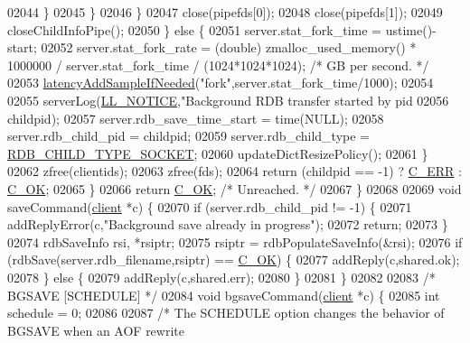 \begin{DoxyCode}
{{{{{{{{{{{{{{{{{{{{{{{{{{{{{{{{{{{{{{{{02044                     \}
02045                 \}
02046             \}
02047             close(pipefds[0]);
02048             close(pipefds[1]);
02049             closeChildInfoPipe();
02050         \} \textcolor{keywordflow}{else} \{
02051             server.stat\_fork\_time = ustime()-start;
02052             server.stat\_fork\_rate = (\textcolor{keywordtype}{double}) zmalloc\_used\_memory() * 1000000 / server.stat\_fork\_time /
       (1024*1024*1024); \textcolor{comment}{/* GB per second. */}
02053             \hyperlink{latency_8h_a77922ab34035890c90f98831a9071359}{latencyAddSampleIfNeeded}(\textcolor{stringliteral}{"fork"},server.stat\_fork\_time/1000);
02054 
02055             serverLog(\hyperlink{server_8h_a8c54c191e436c7dd3012167212692401}{LL\_NOTICE},\textcolor{stringliteral}{"Background RDB transfer started by pid %
02056                 childpid);
02057             server.rdb\_save\_time\_start = time(NULL);
02058             server.rdb\_child\_pid = childpid;
02059             server.rdb\_child\_type = \hyperlink{server_8h_acdbf61346e1d2f54716e2ab6fe73e954}{RDB\_CHILD\_TYPE\_SOCKET};
02060             updateDictResizePolicy();
02061         \}
02062         zfree(clientids);
02063         zfree(fds);
02064         \textcolor{keywordflow}{return} (childpid == -1) ? \hyperlink{server_8h_af98ac28d5f4d23d7ed5985188e6fb7d1}{C\_ERR} : \hyperlink{server_8h_a303769ef1065076e68731584e758d3e1}{C\_OK};
02065     \}
02066     \textcolor{keywordflow}{return} \hyperlink{server_8h_a303769ef1065076e68731584e758d3e1}{C\_OK}; \textcolor{comment}{/* Unreached. */}
02067 \}
02068 
02069 \textcolor{keywordtype}{void} saveCommand(\hyperlink{structclient}{client} *c) \{
02070     \textcolor{keywordflow}{if} (server.rdb\_child\_pid != -1) \{
02071         addReplyError(c,\textcolor{stringliteral}{"Background save already in progress"});
02072         \textcolor{keywordflow}{return};
02073     \}
02074     rdbSaveInfo rsi, *rsiptr;
02075     rsiptr = rdbPopulateSaveInfo(&rsi);
02076     \textcolor{keywordflow}{if} (rdbSave(server.rdb\_filename,rsiptr) == \hyperlink{server_8h_a303769ef1065076e68731584e758d3e1}{C\_OK}) \{
02077         addReply(c,shared.ok);
02078     \} \textcolor{keywordflow}{else} \{
02079         addReply(c,shared.err);
02080     \}
02081 \}
02082 
02083 \textcolor{comment}{/* BGSAVE [SCHEDULE] */}
02084 \textcolor{keywordtype}{void} bgsaveCommand(\hyperlink{structclient}{client} *c) \{
02085     \textcolor{keywordtype}{int} schedule = 0;
02086 
02087     \textcolor{comment}{/* The SCHEDULE option changes the behavior of BGSAVE when an AOF rewrite}
}}}}}}}}}}}}}}}}}}}}}}}}}}}}}}}}}}}}}}}}}
\end{DoxyCode}
